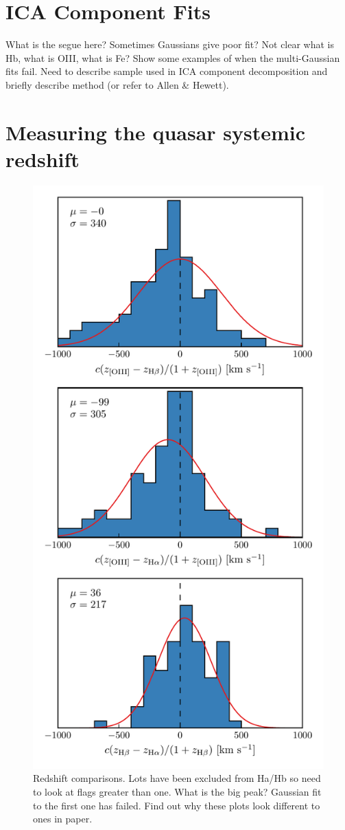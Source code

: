 \section{ICA Component Fits}

What is the segue here? 
Sometimes Gaussians give poor fit? Not clear what is Hb, what is OIII, what is Fe? Show some examples of when the multi-Gaussian fits fail. 
Need to describe sample used in ICA component decomposition and briefly describe method (or refer to Allen \& Hewett). 


\section{Measuring the quasar systemic redshift}


\begin{figure}
    \centering
    \includegraphics[width=0.8\linewidth]{figures/chapter04/redshift_comparison.pdf} 
    \caption{Redshift comparisons. Lots have been excluded from Ha/Hb so need to look at flags greater than one. What is the big peak? Gaussian fit to the first one has failed. Find out why these plots look different to ones in paper.}       
    \label{fig:redshift_comparison}
\end{figure}

